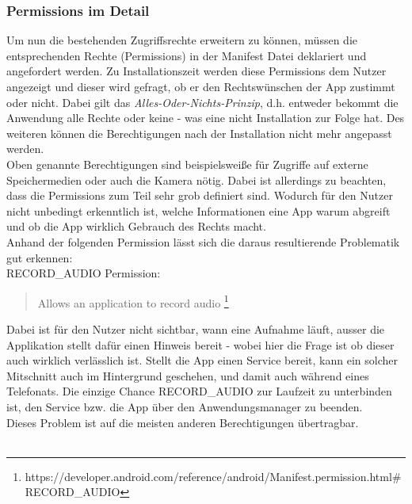	\subsubsection{Permissions im Detail}
	Um nun die bestehenden Zugriffsrechte erweitern zu können, müssen die entsprechenden Rechte (Permissions) in der Manifest Datei deklariert und angefordert werden. Zu Installationszeit werden diese Permissions dem Nutzer angezeigt und dieser wird gefragt, ob er den Rechtswünschen der App zustimmt oder nicht. Dabei gilt das \textit{Alles-Oder-Nichts-Prinzip}, d.h. entweder bekommt die Anwendung alle Rechte oder keine - was eine nicht Installation zur Folge hat. Des weiteren können die Berechtigungen nach der Installation nicht mehr angepasst werden.\\
	Oben genannte Berechtigungen sind beispielsweiße für Zugriffe auf externe Speichermedien oder auch die Kamera nötig. Dabei ist allerdings zu beachten, dass die Permissions zum Teil sehr grob definiert sind. Wodurch für den Nutzer nicht unbedingt erkenntlich ist, welche Informationen eine App warum abgreift und ob die App wirklich Gebrauch des Rechts macht.\\
	Anhand der folgenden Permission lässt sich die daraus resultierende Problematik gut erkennen:\\
	RECORD\_AUDIO Permission:
	\begin{quote}
	Allows an application to record audio \footnote{https://developer.android.com/reference/android/Manifest.permission.html\#RECORD\_AUDIO}
	\end{quote} 
	Dabei ist für den Nutzer nicht sichtbar, wann eine Aufnahme läuft, ausser die Applikation stellt dafür einen Hinweis bereit - wobei hier die Frage ist ob dieser auch wirklich verlässlich ist. Stellt die App einen Service bereit, kann ein solcher Mitschnitt auch im Hintergrund geschehen, und damit auch während eines Telefonats. Die einzige Chance RECORD\_AUDIO zur Laufzeit zu unterbinden ist, den Service bzw. die App über den Anwendungsmanager zu beenden.\\
	Dieses Problem ist auf die meisten anderen Berechtigungen übertragbar.\\\\
